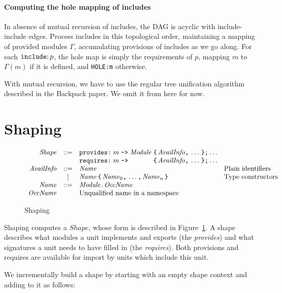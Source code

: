 \documentclass{article}
\newcommand{\I}[1]{\ensuremath{\mathit{#1}}}
\begin{document}
\paragraph{Computing the hole mapping of includes}  In absence of mutual
recursion of includes, the DAG is acyclic with include-include edges.  Process includes
in this topological order, maintaining a mapping of provided modules $\Gamma$, accumulating
provisions of includes as we go along.  For each $\verb|include|; p$, the hole map is
simply the requirements of $p$, mapping $m$ to $\Gamma(m)$ if it is defined, and \verb|HOLE:m| otherwise.

With mutual recursion, we have to use the regular tree unification algorithm described in the Backpack paper.  We omit it from here for now.

\newpage
\section{Shaping}

\begin{figure}[htpb]
$$
\begin{array}{rcll}
\I{Shape} & ::= & \verb|provides:|\; m \; \verb|->|\; \I{Module}\; \verb|{|\, \I{AvailInfo} \verb|,|\, \ldots \, \verb|};| \ldots \\
      &     & \verb|requires:| \; m \; \verb|->|\; \textcolor{white}{\I{Module}}\; \verb|{| \, \I{AvailInfo} \verb|,| \, \ldots \, \verb|}| \verb|;| \ldots \\
\I{AvailInfo} & ::= & \I{Name} & \mbox{Plain identifiers} \\
          & |   & \I{Name} \, \verb|{| \, \I{Name}_0\verb|,| \, \ldots\verb|,| \, \I{Name}_n \, \verb|}| & \mbox{Type constructors} \\
\I{Name}   & ::= & \I{Module} \verb|.| \I{OccName} \\
\I{OccName} & & \mbox{Unqualified name in a namespace}
\end{array}
$$
\caption{Shaping} \label{fig:semantic}
\end{figure}

Shaping computes a \I{Shape}, whose form is described in Figure~\ref{fig:semantic}.
A shape describes what modules a unit implements and exports (the \emph{provides})
and what signatures a unit needs to have filled in (the \emph{requires}).  Both
provisions and requires are available for import by units which include this
unit.

We incrementally build a shape by starting with an empty
shape context and adding to it as follows:
\end{document}
